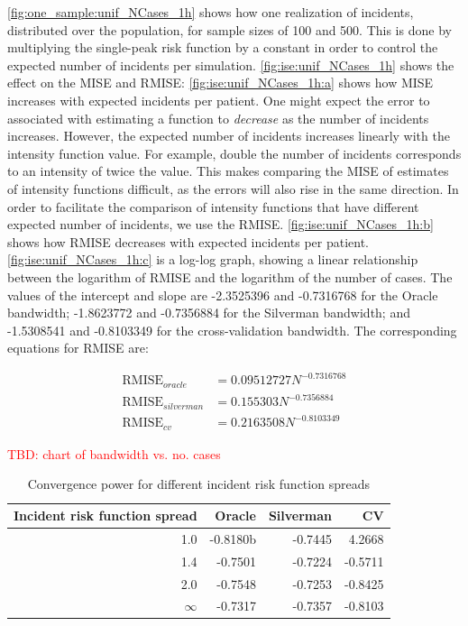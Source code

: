 \autoref{fig:one_sample:unif_NCases_1h} shows how one realization of incidents, distributed over the population, for sample sizes of 100 and 500.
This is done by multiplying the single-peak risk function by a constant in order to control the expected number of incidents per simulation.
\autoref{fig:ise:unif_NCases_1h} shows the effect on the MISE and RMISE:
\autoref{fig:ise:unif_NCases_1h:a} shows how MISE increases with expected incidents per patient.
One might expect the error to associated with estimating a function to \textit{decrease} as the number of incidents increases.
However, the expected number of incidents increases linearly with the intensity function value.
For example, double the number of incidents corresponds to an intensity of twice the value.
This makes comparing the MISE of estimates of intensity functions difficult, as the errors will also rise in the same direction.
In order to facilitate the comparison of intensity functions that have different expected number of incidents, we use the RMISE.
\autoref{fig:ise:unif_NCases_1h:b} shows how RMISE decreases with expected incidents per patient.
\autoref{fig:ise:unif_NCases_1h:c} is a log-log graph, showing a linear relationship between the logarithm of RMISE and the logarithm of the number of cases.
The values of the intercept and slope are -2.3525396 and -0.7316768 for the Oracle bandwidth; -1.8623772 and -0.7356884 for the Silverman bandwidth; and -1.5308541 and -0.8103349 for the cross-validation bandwidth.
The corresponding equations for RMISE are:

\begin{align}
    \mbox{RMISE}_{oracle} &= 0.09512727 N^{-0.7316768} \\
    \mbox{RMISE}_{silverman} &= 0.155303 N^{-0.7356884} \\
    \mbox{RMISE}_{cv} &= 0.2163508 N^{-0.8103349}
\end{align}

\textcolor{red}{TBD: chart of bandwidth vs. no. cases}

\begin{table}
\centering
\begin{tabular}{rrrr}
    \hline
    Incident risk function \gls{spread} & Oracle & Silverman & CV \\ 
    \hline
    1.0 & -0.8180b & -0.7445 & 4.2668 \\
    1.4 & -0.7501 & -0.7224 & -0.5711 \\
    2.0 & -0.7548 & -0.7253 & -0.8425 \\
    \( \infty \) & -0.7317 & -0.7357 & -0.8103
\end{tabular}
\caption{Convergence power for different incident risk function spreads}
\label{tab:convergence_vs_spread}
\end{table}

